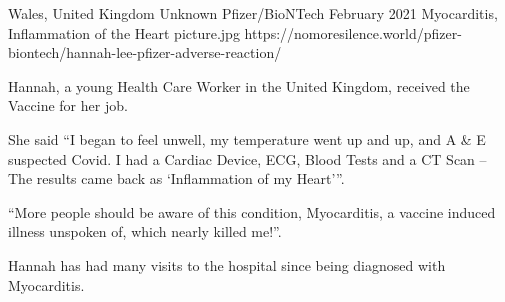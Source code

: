 {Wales, United Kingdom}
{Unknown}
{Pfizer/BioNTech}
{February 2021}
{Myocarditis, Inflammation of the Heart}
{picture.jpg}
{https://nomoresilence.world/pfizer-biontech/hannah-lee-pfizer-adverse-reaction/}
{

Hannah, a young Health Care Worker in the United Kingdom, received the Vaccine
for her job.

She said “I began to feel unwell, my temperature went up and up, and A \& E
suspected Covid. I had a Cardiac Device, ECG, Blood Tests and a CT Scan – The
results came back as ‘Inflammation of my Heart'”.

“More people should be aware of this condition, Myocarditis, a vaccine induced
illness unspoken of, which nearly killed me!”.

Hannah has had many visits to the hospital since being diagnosed with
Myocarditis.

}
